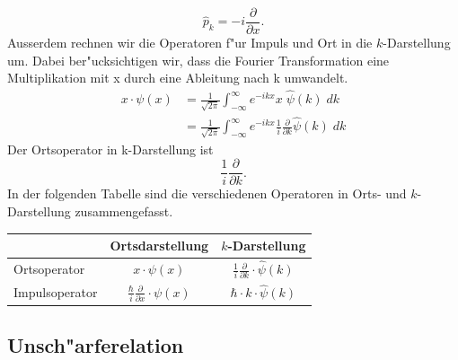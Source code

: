 \begin{refsection}
\begin{equation}
\hat p_{k} = -i\frac{\partial}{\partial x}.
\end{equation}
Ausserdem rechnen wir die Operatoren f"ur Impuls und Ort in die $k$-Darstellung um.
Dabei ber"ucksichtigen wir, dass die Fourier Transformation eine Multiplikation mit x durch eine Ableitung nach k umwandelt.
\begin{align}
x\cdot\psi(x) &= \frac{1}{\sqrt{2\pi }} \int_{-\infty}^{\infty} e^{-ikx} x \;\hat{\psi}(k) \; dk\\
&= \frac{1}{\sqrt{2\pi }} \int_{-\infty}^{\infty} e^{-ikx} \frac{1}{i}\frac{\partial}{\partial k} \hat{\psi}(k) \; dk
\end{align}
Der Ortsoperator in k-Darstellung ist 
\begin{equation}
\frac{1}{i}\frac{\partial}{\partial k}.
\end{equation}
In der folgenden Tabelle sind die verschiedenen Operatoren in Orts- und $k$-Darstellung zusammengefasst.
\begin{center}
\renewcommand{\arraystretch}{1.25}
\begin{tabular}{|l|c|c|}
\hline
& Ortsdarstellung & $k$-Darstellung\\
\hline
Ortsoperator & $x \cdot \psi(x) $ & $\frac{1}{i}\frac{\partial}{\partial k} \cdot \hat{\psi}(k)$\\
 \hline
Impulsoperator & $\frac{\hbar}{i}\frac{\partial}{\partial x} \cdot \psi(x)$ & $\hbar \cdot k \cdot \hat{\psi}(k)$\\
\hline
\end{tabular}
\renewcommand{\arraystretch}{1}
\end{center}

\subsection{Unsch"arferelation}


\end{refsection}
